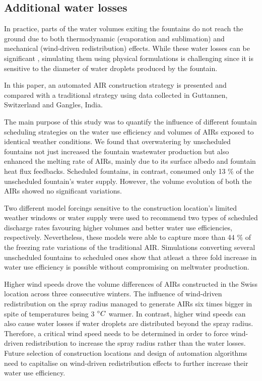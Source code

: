 \documentclass[tc, manuscript]{copernicus}
\begin{document}
\subsection{Additional water losses}

In practice, parts of the water volumes exiting the fountains do not reach the ground due to both thermodynamic
(evaporation and sublimation) and mechanical (wind-driven redistribution) effects. While these water losses can
be significant \citep{hanzerSimulationSnowManagement2020}, simulating them using physical formulations is
challenging since it is sensitive to the diameter of water droplets produced by the fountain.


\conclusions

In this paper, an automated AIR construction strategy is presented and compared with a traditional strategy
using data collected in Guttannen, Switzerland and Gangles, India.

The main purpose of this study was to quantify the influence of different fountain scheduling strategies on the
water use efficiency and volumes of AIRs exposed to identical weather conditions. We found that overwatering by
unscheduled fountains not just increased the fountain wastewater production but also enhanced the melting rate
of AIRs, mainly due to its surface albedo and fountain heat flux feedbacks. Scheduled fountains, in contrast,
consumed only 13 \% of the unscheduled fountain's water supply. However, the volume evolution of both the AIRs
showed no significant variations. 

Two different model forcings sensitive to the construction location's limited weather windows or water supply
were used to recommend two types of scheduled discharge rates favouring higher volumes and better water use
efficiencies, respectively. Nevertheless, these models were able to capture more than 44 \% of the freezing rate
variations of the traditional AIR. Simulations converting several unscheduled fountains to scheduled ones show
that atleast a three fold increase in water use efficiency is possible without compromising on meltwater
production.

Higher wind speeds drove the volume differences of AIRs constructed in the Swiss location across three
consecutive winters. The influence of wind-driven redistribution on the spray radius managed to generate AIRs
six times bigger in spite of temperatures being 3 $^{\circ} C$ warmer. In contrast, higher wind speeds can also
cause water losses if water droplets are distributed beyond the spray radius. Therefore, a critical wind speed
needs to be determined in order to force wind-driven redistribution to increase the spray radius rather than the
water losses. Future selection of construction locations and design of automation algorithms need to capitalise
on wind-driven redistribution effects to further increase their water use efficiency.
\end{document}
